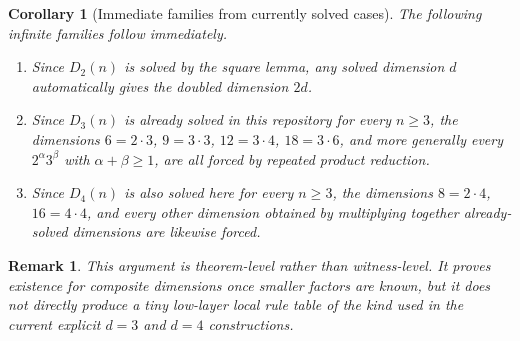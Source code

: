 \documentclass[11pt]{article}
\newtheorem{corollary}[proposition]{Corollary}
\newtheorem{remark}[proposition]{Remark}
\newcommand{\torus}[2]{D_{#1}(#2)}
\begin{document}
\begin{corollary}[Immediate families from currently solved cases]
The following infinite families follow immediately.
\begin{enumerate}
\item Since $\torus{2}{n}$ is solved by the square lemma, any solved dimension
    $d$ automatically gives the doubled dimension $2d$.
\item Since $\torus{3}{n}$ is already solved in this repository for every
    $n \ge 3$, the dimensions $6=2\cdot 3$, $9=3\cdot 3$, $12=3\cdot 4$,
    $18=3\cdot 6$, and more generally every $2^{\alpha}3^{\beta}$ with
    $\alpha+\beta \ge 1$, are all forced by repeated product reduction.
\item Since $\torus{4}{n}$ is also solved here for every $n \ge 3$, the
    dimensions $8=2\cdot 4$, $16=4\cdot 4$, and every other dimension obtained
    by multiplying together already-solved dimensions are likewise forced.
\end{enumerate}
\end{corollary}

\begin{remark}
This argument is theorem-level rather than witness-level. It proves existence
for composite dimensions once smaller factors are known, but it does not
directly produce a tiny low-layer local rule table of the kind used in the
current explicit $d=3$ and $d=4$ constructions.
\end{remark}
\end{document}
